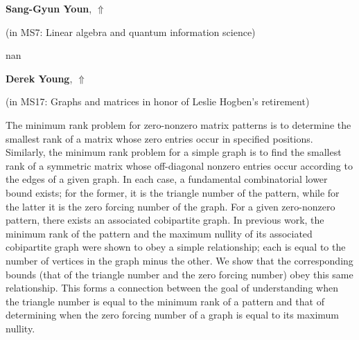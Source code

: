 \documentclass[ILAS2025-program.tex]{subfiles}
\begin{document}
     \hypertarget{down0362}{}\begin{ilasabstract}
    
    \textbf{Sang-Gyun Youn},  \hfill \hyperlink{up0362}{$\Uparrow$}
    
    (in {\color{mstitle}MS7: Linear algebra and quantum information science})
        
        \mtskip
    nan\end{ilasabstract}
     \hypertarget{down0224}{}\begin{ilasabstract}
    
    \textbf{Derek Young},  \hfill \hyperlink{up0224}{$\Uparrow$}
    
    (in {\color{mstitle}MS17: Graphs and matrices in honor of Leslie Hogben's retirement})
        
        \mtskip
    The minimum rank problem for zero-nonzero matrix patterns is to determine the
smallest rank of a matrix whose zero entries occur in specified positions.
Similarly, the minimum rank problem for a simple graph is to find the smallest
rank of a symmetric matrix whose off-diagonal nonzero entries occur according
to the edges of a given graph.  In each case, a fundamental combinatorial lower
bound exists; for the former, it is the triangle number of the pattern, while
for the latter it is the zero forcing number of the graph.  For a given
zero-nonzero pattern, there exists an associated cobipartite graph.  In
previous work, the minimum rank of the pattern and the maximum nullity of its
associated cobipartite graph were shown to obey a simple relationship; each is
equal to the number of vertices in the graph minus the other.  We show that the
corresponding bounds (that of the triangle number and the zero forcing number)
obey this same relationship.  This forms a connection between the goal of
understanding when the triangle number is equal to the minimum rank of a
pattern and that of determining when the zero forcing number of a graph is
equal to its maximum nullity.
\end{ilasabstract}
\end{document}
